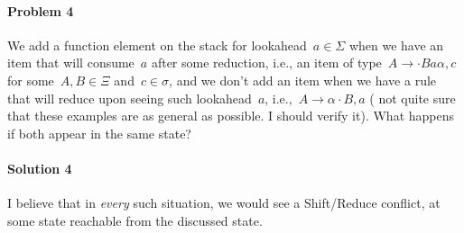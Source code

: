 \paragraph{Problem 4} We add a function element on the stack for lookahead~$a∈Σ$
  when we have an item that will consume~$a$ after some reduction,
  i.e., an item of type~$A→·Baα,c$ for some~$A,B∈Ξ$ and~$c∈σ$,
  and we don't add an item when we have a rule that will reduce
  upon seeing such lookahead~$a$, i.e.,~$A→α·B , a$
  ( not quite sure that these examples are as general as possible. I should verify it).
  What happens if both appear in the same state?

\paragraph{Solution 4} I believe that in \emph{every} such situation,
  we would see a Shift/Reduce conflict, at some state reachable from the discussed state.
